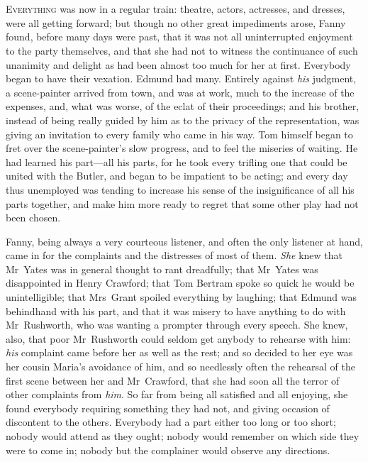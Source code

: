 \chapter[Chapter \thechapter]{} 

 \lettrine[lraise=0.3]{E}{verything} was now in a regular train: theatre, actors, actresses, and dresses, were all getting forward; but though no other great impediments arose, Fanny found, before many days were past, that it was not all uninterrupted enjoyment to the party themselves, and that she had not to witness the continuance of such unanimity and delight as had been almost too much for her at first. Everybody began to have their vexation. Edmund had many. Entirely against \textit{his}  judgment, a scene-painter arrived from town, and was at work, much to the increase of the expenses, and, what was worse, of the eclat of their proceedings; and his brother, instead of being really guided by him as to the privacy of the representation, was giving an invitation to every family who came in his way. Tom himself began to fret over the scene-painter's slow progress, and to feel the miseries of waiting. He had learned his part—all his parts, for he took every trifling one that could be united with the Butler, and began to be impatient to be acting; and every day thus unemployed was tending to increase his sense of the insignificance of all his parts together, and make him more ready to regret that some other play had not been chosen.

Fanny, being always a very courteous listener, and often the only listener at hand, came in for the complaints and the distresses of most of them. \textit{She}  knew that Mr~Yates was in general thought to rant dreadfully; that Mr~Yates was disappointed in Henry Crawford; that Tom Bertram spoke so quick he would be unintelligible; that Mrs~Grant spoiled everything by laughing; that Edmund was behindhand with his part, and that it was misery to have anything to do with Mr~Rushworth, who was wanting a prompter through every speech. She knew, also, that poor Mr~Rushworth could seldom get anybody to rehearse with him: \textit{his}  complaint came before her as well as the rest; and so decided to her eye was her cousin Maria's avoidance of him, and so needlessly often the rehearsal of the first scene between her and Mr~Crawford, that she had soon all the terror of other complaints from \textit{him}. So far from being all satisfied and all enjoying, she found everybody requiring something they had not, and giving occasion of discontent to the others. Everybody had a part either too long or too short; nobody would attend as they ought; nobody would remember on which side they were to come in; nobody but the complainer would observe any directions.

